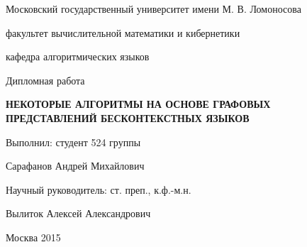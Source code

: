 \thispagestyle{empty}
\begin{center}
{
    \large
    Московский государственный университет имени М. В. Ломоносова\par
    факультет вычислительной математики и кибернетики\par
    кафедра алгоритмических языков\par
}
\par
\end{center}

\vspace{20mm}
\begin{flushright}

{\sl}%
\end{flushright}

\begin{center}
%


\vspace{30mm}
Дипломная работа

\vspace{5mm}
{
    \bf \large
    НЕКОТОРЫЕ АЛГОРИТМЫ НА ОСНОВЕ ГРАФОВЫХ ПРЕДСТАВЛЕНИЙ БЕСКОНТЕКСТНЫХ ЯЗЫКОВ
    \par
}

\end{center}

\vspace{20mm}
\begin{flushright}
Выполнил: студент 524 группы

Сарафанов Андрей Михайлович

\vspace{10mm}
Научный руководитель: ст. преп., к.ф.-м.н.

Вылиток Алексей Александрович
\end{flushright}

\vspace{81mm}
\begin{center}
{Москва 2015}
\end{center}

\newpage

